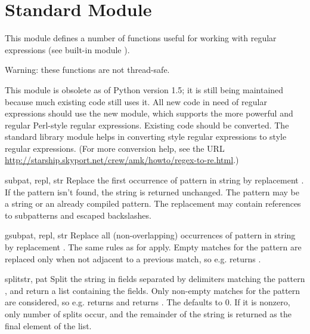 \section{Standard Module }
\label{module-regsub}

This module defines a number of functions useful for working with
regular expressions (see built-in module ).

Warning: these functions are not thread-safe.

This module is obsolete as of Python version 1.5; it is still being
maintained because much existing code still uses it.  All new code in
need of regular expressions should use the new  module, which
supports the more powerful and regular Perl-style regular expressions.
Existing code should be converted.  The standard library module
 helps in converting  style regular
expressions to  style regular expressions.  (For more
conversion help, see the URL
\url{http://starship.skyport.net/crew/amk/howto/regex-to-re.html}.)


\begin{funcdesc}{sub}{pat, repl, str}
Replace the first occurrence of pattern  in string
 by replacement .  If the pattern isn't found,
the string is returned unchanged.  The pattern may be a string or an
already compiled pattern.  The replacement may contain references
 to subpatterns and escaped backslashes.
\end{funcdesc}

\begin{funcdesc}{gsub}{pat, repl, str}
Replace all (non-overlapping) occurrences of pattern  in
string  by replacement .  The same rules as for
 apply.  Empty matches for the pattern are replaced only
when not adjacent to a previous match, so e.g.
 returns .
\end{funcdesc}

\begin{funcdesc}{split}{str, pat}
Split the string  in fields separated by delimiters matching
the pattern , and return a list containing the fields.  Only
non-empty matches for the pattern are considered, so e.g.
 returns \code{['a', 'b']} and
 returns \code{['abc']}.  The 
defaults to 0. If it is nonzero, only  number of splits
occur, and the remainder of the string is returned as the final
element of the list.
\end{funcdesc}

